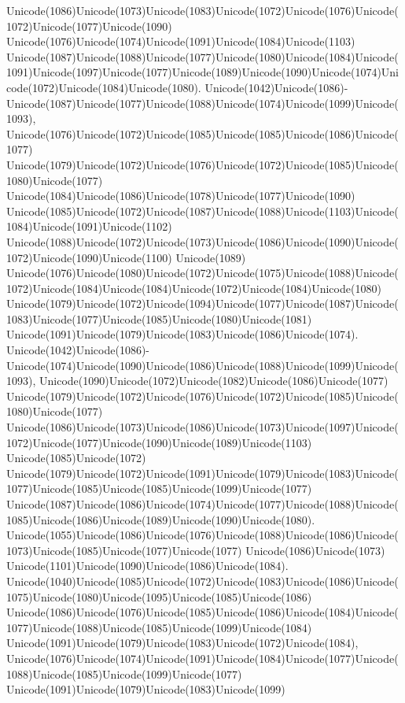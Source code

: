 \documentclass[a4paper,11pt]{report}
\begin{document}
{{Unicode(1086)Unicode(1073)Unicode(1083)Unicode(1072)Unicode(1076)Unicode(1072)Unicode(1077)Unicode(1090)
Unicode(1076)Unicode(1074)Unicode(1091)Unicode(1084)Unicode(1103)
Unicode(1087)Unicode(1088)Unicode(1077)Unicode(1080)Unicode(1084)Unicode(1091)Unicode(1097)Unicode(1077)Unicode(1089)Unicode(1090)Unicode(1074)Unicode(1072)Unicode(1084)Unicode(1080).
Unicode(1042)Unicode(1086)-Unicode(1087)Unicode(1077)Unicode(1088)Unicode(1074)Unicode(1099)Unicode(1093),
Unicode(1076)Unicode(1072)Unicode(1085)Unicode(1085)Unicode(1086)Unicode(1077)
Unicode(1079)Unicode(1072)Unicode(1076)Unicode(1072)Unicode(1085)Unicode(1080)Unicode(1077)
Unicode(1084)Unicode(1086)Unicode(1078)Unicode(1077)Unicode(1090)
Unicode(1085)Unicode(1072)Unicode(1087)Unicode(1088)Unicode(1103)Unicode(1084)Unicode(1091)Unicode(1102)
Unicode(1088)Unicode(1072)Unicode(1073)Unicode(1086)Unicode(1090)Unicode(1072)Unicode(1090)Unicode(1100)
Unicode(1089)
Unicode(1076)Unicode(1080)Unicode(1072)Unicode(1075)Unicode(1088)Unicode(1072)Unicode(1084)Unicode(1084)Unicode(1072)Unicode(1084)Unicode(1080)
Unicode(1079)Unicode(1072)Unicode(1094)Unicode(1077)Unicode(1087)Unicode(1083)Unicode(1077)Unicode(1085)Unicode(1080)Unicode(1081)
Unicode(1091)Unicode(1079)Unicode(1083)Unicode(1086)Unicode(1074).
Unicode(1042)Unicode(1086)-Unicode(1074)Unicode(1090)Unicode(1086)Unicode(1088)Unicode(1099)Unicode(1093),
Unicode(1090)Unicode(1072)Unicode(1082)Unicode(1086)Unicode(1077)
Unicode(1079)Unicode(1072)Unicode(1076)Unicode(1072)Unicode(1085)Unicode(1080)Unicode(1077)
Unicode(1086)Unicode(1073)Unicode(1086)Unicode(1073)Unicode(1097)Unicode(1072)Unicode(1077)Unicode(1090)Unicode(1089)Unicode(1103)
Unicode(1085)Unicode(1072)
Unicode(1079)Unicode(1072)Unicode(1091)Unicode(1079)Unicode(1083)Unicode(1077)Unicode(1085)Unicode(1085)Unicode(1099)Unicode(1077)
Unicode(1087)Unicode(1086)Unicode(1074)Unicode(1077)Unicode(1088)Unicode(1085)Unicode(1086)Unicode(1089)Unicode(1090)Unicode(1080).
Unicode(1055)Unicode(1086)Unicode(1076)Unicode(1088)Unicode(1086)Unicode(1073)Unicode(1085)Unicode(1077)Unicode(1077)
Unicode(1086)Unicode(1073)
Unicode(1101)Unicode(1090)Unicode(1086)Unicode(1084).
Unicode(1040)Unicode(1085)Unicode(1072)Unicode(1083)Unicode(1086)Unicode(1075)Unicode(1080)Unicode(1095)Unicode(1085)Unicode(1086)
Unicode(1086)Unicode(1076)Unicode(1085)Unicode(1086)Unicode(1084)Unicode(1077)Unicode(1088)Unicode(1085)Unicode(1099)Unicode(1084)
Unicode(1091)Unicode(1079)Unicode(1083)Unicode(1072)Unicode(1084),
Unicode(1076)Unicode(1074)Unicode(1091)Unicode(1084)Unicode(1077)Unicode(1088)Unicode(1085)Unicode(1099)Unicode(1077)
Unicode(1091)Unicode(1079)Unicode(1083)Unicode(1099)
}}
\end{document}
